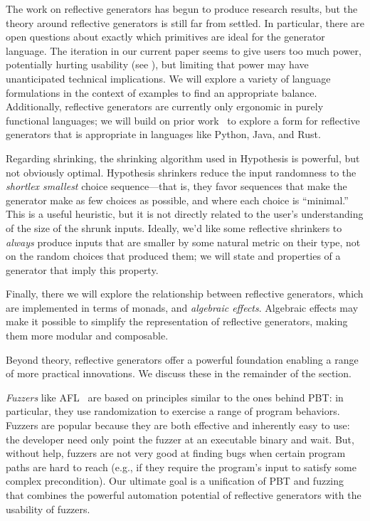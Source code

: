 The work on reflective generators has begun to produce research results, but
the theory around reflective generators is still far from settled.
In particular,
there are open questions
about exactly which primitives are ideal for the generator language. The
iteration in our current paper seems to give users too much power,
potentially hurting usability (see
), but limiting that power may have unanticipated technical
implications. We will explore a variety of language formulations in the context
of examples to find an appropriate balance.
Additionally, reflective generators
are currently only ergonomic in purely functional languages; we will build on
prior work~\cite{brachthauser_representing_2021,delaat_pymonad_nodate} to
explore a form for reflective generators that is appropriate in languages like
Python, Java, and Rust.

Regarding shrinking, the shrinking algorithm used in Hypothesis is powerful,
but not obviously optimal. Hypothesis shrinkers reduce the input
randomness to the
{\em shortlex smallest} choice sequence---that is, they favor
sequences that make the
generator make as few choices as possible, and where each choice is
``minimal.''  This is a useful heuristic, but it is not directly
related to the user's understanding of the size of the shrunk
inputs. Ideally, we'd like some
reflective shrinkers to {\em always} produce inputs that are smaller by some
natural metric on their type, not on the random choices that produced them; we
will state and properties of a generator that imply this property.

Finally, there we will explore the relationship between reflective
generators, which are implemented in terms of monads, and {\em algebraic
effects}. Algebraic effects may make it possible to simplify the representation
of reflective generators, making them more modular and composable.

Beyond theory, reflective generators offer a powerful foundation
enabling a range of more practical innovations.  We discuss these in
the remainder of the section.


%
{\em Fuzzers} like AFL~\cite{afl-readme} are based on principles
similar to the
ones behind PBT: in particular, they use randomization to exercise a
range of
program behaviors. Fuzzers are popular because they are both effective and
inherently easy to use: the developer need only point the fuzzer at an
executable binary and
wait. But, without help, fuzzers are not very good at finding
bugs when certain program paths are hard to reach (e.g., if they require the
program's input to satisfy some complex precondition).
Our ultimate goal is a unification of PBT and fuzzing that combines the
powerful automation potential of reflective generators with the usability of
fuzzers.

